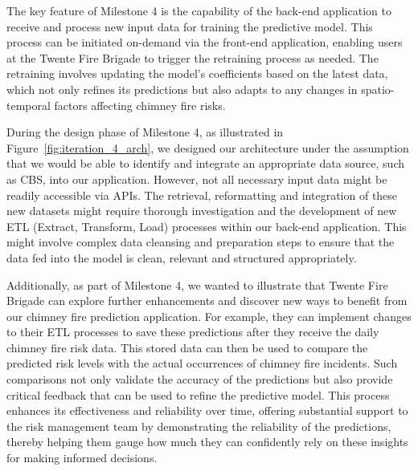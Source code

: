 \documentclass{utitcphd_overleaf}
\begin{document}
The key feature of Milestone 4 is the capability of the back-end application to receive and process new input data for training the predictive model. This process can be initiated on-demand via the front-end application, enabling users at the Twente Fire Brigade to trigger the retraining process as needed. The retraining involves updating the model's coefficients based on the latest data, which not only refines its predictions but also adapts to any changes in spatio-temporal factors affecting chimney fire risks.

During the design phase of Milestone 4, as illustrated in Figure~\ref{fig:iteration_4_arch}, we designed our architecture under the assumption that we would be able to identify and integrate an appropriate data source, such as CBS, into our application. However, not all necessary input data might be readily accessible via APIs. The retrieval, reformatting and integration of these new datasets might require thorough investigation and the development of new ETL (Extract, Transform, Load) processes within our back-end application. This might involve complex data cleansing and preparation steps to ensure that the data fed into the model is clean, relevant and structured appropriately.

Additionally, as part of Milestone 4, we wanted to illustrate that Twente Fire Brigade can explore further enhancements and discover new ways to benefit from our chimney fire prediction application. For example, they can implement changes to their ETL processes to save these predictions after they receive the daily chimney fire risk data. This stored data can then be used to compare the predicted risk levels with the actual occurrences of chimney fire incidents. Such comparisons not only validate the accuracy of the predictions but also provide critical feedback that can be used to refine the predictive model. This process enhances its effectiveness and reliability over time, offering substantial support to the risk management team by demonstrating the reliability of the predictions, thereby helping them gauge how much they can confidently rely on these insights for making informed decisions.
\end{document}
